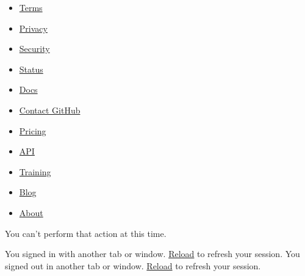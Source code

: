 \documentclass[
  english,
]{article}
\providecommand{\tightlist}{%
  \setlength{\itemsep}{0pt}\setlength{\parskip}{0pt}}
\begin{document}
\begin{itemize}
\tightlist
\item
  \href{https://docs.github.com/en/github/site-policy/github-terms-of-service}{Terms}
\item
  \href{https://docs.github.com/en/github/site-policy/github-privacy-statement}{Privacy}
\item
  \href{https://github.com/security}{Security}
\item
  \href{https://www.githubstatus.com/}{Status}
\item
  \href{https://docs.github.com}{Docs}
\item
  \href{https://support.github.com?tags=dotcom-footer}{Contact GitHub}
\item
  \href{https://github.com/pricing}{Pricing}
\item
  \href{https://docs.github.com}{API}
\item
  \href{https://services.github.com}{Training}
\item
  \href{https://github.blog}{Blog}
\item
  \href{https://github.com/about}{About}
\end{itemize}

{}

\hypertarget{ajax-error-message}{}
You can't perform that action at this time.

{You signed in with another tab or window. \href{}{Reload} to refresh
your session.} {You signed out in another tab or window. \href{}{Reload}
to refresh your session.}
\end{document}
